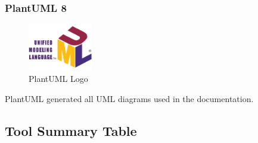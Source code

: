 \subsubsection*{PlantUML {8}}
\begin{figure}[H]
  \centering
  \includegraphics[width=0.25\textwidth]{figures/logos/uml-logo.png}
  \caption{PlantUML Logo}
\end{figure}
PlantUML generated all UML diagrams used in the documentation.

\subsection{Tool Summary Table}

